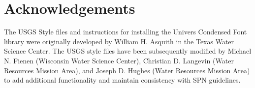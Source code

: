 \documentclass[11pt]{article}
\begin{document}
\section*{\textsf{Acknowledgements}}

The USGS Style files and instructions for installing the Univers Condensed Font library were originally developed by William H. Asquith in the Texas Water Science Center. The USGS style files have been subsequently modified by Michael N. Fienen (Wisconsin Water Science Center), Christian D. Langevin (Water Resources Mission Area), and Joseph D. Hughes (Water Resources Mission Area) to add additional functionality and maintain consistency with SPN guidelines. 
\end{document}
